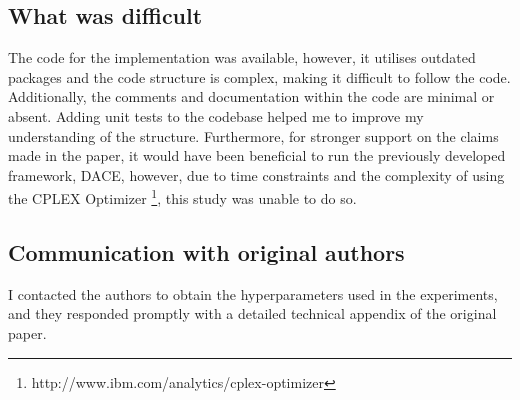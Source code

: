 


\subsection{What was difficult}
The code for the implementation was available, however, it utilises outdated packages and the code structure is complex, making it difficult to follow the code. Additionally, the comments and documentation within the code are minimal or absent. Adding unit tests to the codebase helped me to improve my understanding of the structure. Furthermore, for stronger support on the claims made in the paper, it would have been beneficial to run the previously developed framework, DACE, however, due to time constraints and the complexity of using the CPLEX Optimizer \footnote{http://www.ibm.com/analytics/cplex-optimizer}, this study was unable to do so.



\subsection{Communication with original authors}
I contacted the authors to obtain the hyperparameters used in the experiments, and they responded promptly with a detailed technical appendix of the original paper.

